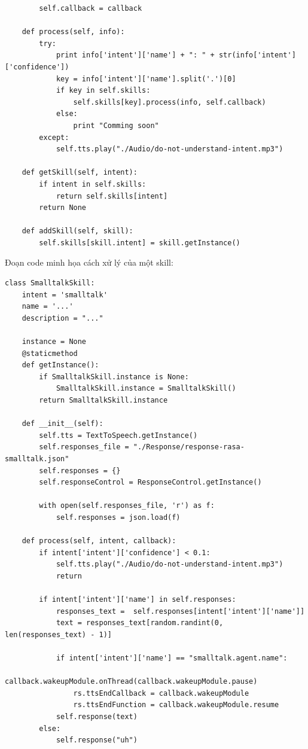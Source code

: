 \begin{itemize}
\begin{lstlisting}
        self.callback = callback

    def process(self, info):
        try:
            print info['intent']['name'] + ": " + str(info['intent']['confidence'])
            key = info['intent']['name'].split('.')[0]
            if key in self.skills:
                self.skills[key].process(info, self.callback)
            else:
                print "Comming soon"
        except:
            self.tts.play("./Audio/do-not-understand-intent.mp3")

    def getSkill(self, intent):
        if intent in self.skills:
            return self.skills[intent]
        return None

    def addSkill(self, skill):
        self.skills[skill.intent] = skill.getInstance()
\end{lstlisting}

Đoạn code minh họa cách xử lý của một skill:
\begin{lstlisting}
class SmalltalkSkill:
    intent = 'smalltalk'
    name = '...'
    description = "..."
    
    instance = None
    @staticmethod
    def getInstance():
        if SmalltalkSkill.instance is None:
            SmalltalkSkill.instance = SmalltalkSkill()
        return SmalltalkSkill.instance

    def __init__(self):
        self.tts = TextToSpeech.getInstance()
        self.responses_file = "./Response/response-rasa-smalltalk.json"
        self.responses = {}
        self.responseControl = ResponseControl.getInstance()

        with open(self.responses_file, 'r') as f:
            self.responses = json.load(f)
    
    def process(self, intent, callback):
        if intent['intent']['confidence'] < 0.1:
            self.tts.play("./Audio/do-not-understand-intent.mp3")
            return
        
        if intent['intent']['name'] in self.responses:
            responses_text =  self.responses[intent['intent']['name']]
            text = responses_text[random.randint(0, len(responses_text) - 1)]

            if intent['intent']['name'] == "smalltalk.agent.name":
                callback.wakeupModule.onThread(callback.wakeupModule.pause)
                rs.ttsEndCallback = callback.wakeupModule
                rs.ttsEndFunction = callback.wakeupModule.resume
            self.response(text)
        else:
            self.response("uh")


\end{lstlisting}
\end{itemize}
